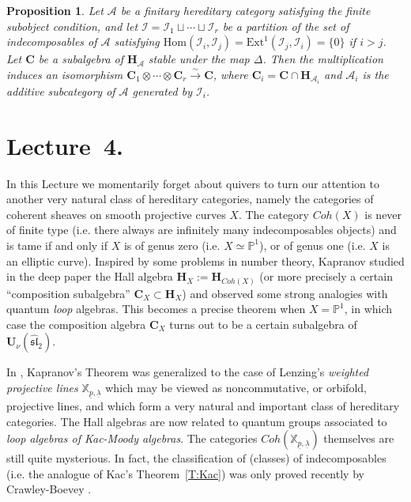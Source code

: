 \documentclass[a4paper,10pt]{amsart}
\def\H{\mathbf{H}}
\def\U{\mathbf{U}}
\newtheorem{prop}[theo]{Proposition}
\numberwithin{equation}{section}
\begin{document}
\vspace{.1in}

\begin{prop}\label{P:lasttame} Let $\mathcal{A}$ be a finitary hereditary category satisfying the finite subobject condition, and let $\mathcal{I}=\mathcal{I}_1 \sqcup \cdots \sqcup \mathcal{I}_r$ be a partition of the set of indecomposables of $\mathcal{A}$ satisfying $\text{Hom}(\mathcal{I}_i,\mathcal{I}_j)=\text{Ext}^1(\mathcal{I}_j,\mathcal{I}_i)=\{0\}$ if $i > j$.
Let $\mathbf{C}$ be a subalgebra of $\H_{\mathcal{A}}$ stable under the map $\Delta$. Then the multiplication induces an isomorphism $\mathbf{C}_1 \otimes \cdots \otimes \mathbf{C}_r \stackrel{\sim}{\to} \mathbf{C}$, where $\mathbf{C}_i=\mathbf{C} \cap \H_{\mathcal{A}_i}$ and $\mathcal{A}_i$ is the additive subcategory of $\mathcal{A}$ generated by $\mathcal{I}_i$.
\end{prop}

\newpage

\section{Lecture~4.}

\setcounter{section}{4}
\setcounter{theo}{0}
\setcounter{equation}{0}

\vspace{.15in}

In this Lecture we momentarily forget about quivers to turn our attention to another very natural class of hereditary categories, namely the categories of coherent sheaves on smooth projective curves $X$.
The category $Coh(X)$ is never of finite type (i.e. there always are infinitely many indecomposables
objects) and is tame if and only if $X$ is of genus zero (i.e. $X \simeq \mathbb{P}^1$), or of genus one (i.e. $X$ is an elliptic curve). Inspired by some problems in number theory, Kapranov studied in the deep paper \cite{Kap1} the Hall algebra $\H_{X}:=\H_{Coh(X)}$ (or more precisely a certain ``composition subalgebra'' $\mathbf{C}_X \subset \H_{X}$) and observed some strong analogies with quantum \textit{loop} algebras. This becomes a precise theorem when $X=\mathbb{P}^1$, in which case the composition algebra $\mathbf{C}_X$ turns out to be a certain subalgebra of $\U_{\nu}(\widehat{\mathfrak{sl}}_2)$.

In \cite{SDuke}, Kapranov's Theorem was generalized to the case of Lenzing's \textit{weighted projective lines} $\mathbb{X}_{\underline{p},\underline{\lambda}}$ which may be viewed as noncommutative, or orbifold, projective lines, and which form a very natural and important class of hereditary categories. The Hall algebras are now related to quantum groups associated to \textit{loop algebras of Kac-Moody algebras}. The categories $Coh(\mathbb{X}_{\underline{p},\underline{\lambda}})$ themselves are still quite mysterious. In fact, the classification of (classes) of indecomposables (i.e. the analogue of Kac's Theorem~\ref{T:Kac}) was only proved recently by Crawley-Boevey \cite{CB2}.
\end{document}
